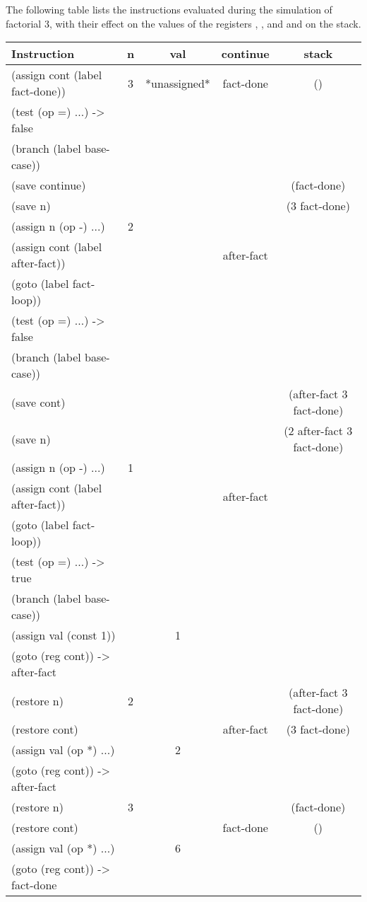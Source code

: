 \begin{exe}[5.5]
    The following table lists the instructions evaluated during the simulation 
    of factorial 3, with their effect on the values of the registers , 
    , and  and on the stack.
    \begin{longtable}{|l|c|c|c|c|}
        \hline
        \bfseries Instruction & \bfseries n & \bfseries val & \bfseries continue 
        & \bfseries stack \\\hline
        \endhead
        (assign cont (label fact-done)) & 3 & *unassigned* & fact-done & () 
        \\\hline
        (test (op =) ...) -> false &&&& \\\hline
        (branch (label base-case)) &&&& \\\hline
        (save continue) &&&& (fact-done) \\\hline
        (save n) &&&& (3 fact-done) \\\hline
        (assign n (op -) ...) & 2 &&& \\\hline
        (assign cont (label after-fact)) &&& after-fact & \\\hline
        (goto (label fact-loop)) &&&& \\\hline
        (test (op =) ...) -> false &&&& \\\hline
        (branch (label base-case)) &&&& \\\hline
        (save cont) &&&& (after-fact 3 fact-done) \\\hline
        (save n) &&&& (2 after-fact 3 fact-done) \\\hline
        (assign n (op -) ...) & 1 &&& \\\hline
        (assign cont (label after-fact)) &&& after-fact & \\\hline
        (goto (label fact-loop)) &&&& \\\hline
        (test (op =) ...) -> true &&&& \\\hline
        (branch (label base-case)) &&&& \\\hline
        (assign val (const 1)) && 1 && \\\hline
        (goto (reg cont)) -> after-fact &&&& \\\hline
        (restore n) & 2 &&& (after-fact 3 fact-done) \\\hline
        (restore cont) &&& after-fact & (3 fact-done) \\\hline
        (assign val (op *) ...) && 2 && \\\hline
        (goto (reg cont)) -> after-fact &&&& \\\hline
        (restore n) & 3 &&& (fact-done) \\\hline
        (restore cont) &&& fact-done & () \\\hline
        (assign val (op *) ...) && 6 && \\\hline
        (goto (reg cont)) -> fact-done &&&& \\\hline
    \end{longtable}


\end{exe}
